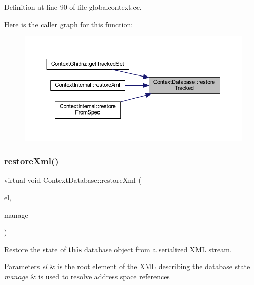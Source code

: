 Definition at line 90 of file globalcontext.\+cc.

Here is the caller graph for this function\+:
\nopagebreak
\begin{figure}[H]
\begin{center}
\leavevmode
\includegraphics[width=350pt]{class_context_database_a566bc8f30012254edd3c86303c479386_icgraph}
\end{center}
\end{figure}
\mbox{\label{class_context_database_a779b5bcb5326d79e748a3dc9df0137d0}} 
\subsubsection{\texorpdfstring{restoreXml()}{restoreXml()}}
{\footnotesize\ttfamily virtual void Context\+Database\+::restore\+Xml (\begin{DoxyParamCaption}\item[{const \mbox{\hyperlink{class_element}{Element}} $\ast$}]{el,  }\item[{const \mbox{\hyperlink{class_addr_space_manager}{Addr\+Space\+Manager}} $\ast$}]{manage }\end{DoxyParamCaption})\hspace{0.3cm}{\ttfamily [pure virtual]}}



Restore the state of {\bfseries{this}} database object from a serialized X\+ML stream. 


\begin{DoxyParams}{Parameters}
{\em el} & is the root element of the X\+ML describing the database state \\
\hline
{\em manage} & is used to resolve address space references \\
\hline
\end{DoxyParams}


